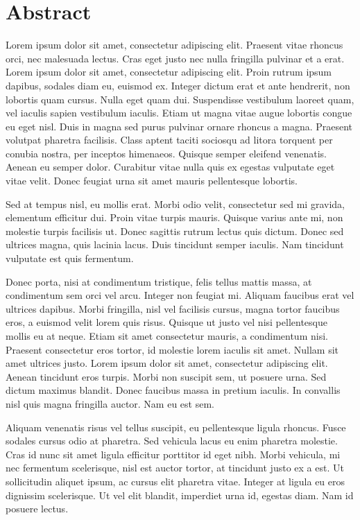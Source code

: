 \chapter*{Abstract}

Lorem ipsum dolor sit amet, consectetur adipiscing elit. Praesent vitae rhoncus orci, nec malesuada lectus. Cras eget justo nec nulla fringilla pulvinar et a erat. Lorem ipsum dolor sit amet, consectetur adipiscing elit. Proin rutrum ipsum dapibus, sodales diam eu, euismod ex. Integer dictum erat et ante hendrerit, non lobortis quam cursus. Nulla eget quam dui. Suspendisse vestibulum laoreet quam, vel iaculis sapien vestibulum iaculis. Etiam ut magna vitae augue lobortis congue eu eget nisl. Duis in magna sed purus pulvinar ornare rhoncus a magna. Praesent volutpat pharetra facilisis. Class aptent taciti sociosqu ad litora torquent per conubia nostra, per inceptos himenaeos. Quisque semper eleifend venenatis. Aenean eu semper dolor. Curabitur vitae nulla quis ex egestas vulputate eget vitae velit. Donec feugiat urna sit amet mauris pellentesque lobortis.

Sed at tempus nisl, eu mollis erat. Morbi odio velit, consectetur sed mi gravida, elementum efficitur dui. Proin vitae turpis mauris. Quisque varius ante mi, non molestie turpis facilisis ut. Donec sagittis rutrum lectus quis dictum. Donec sed ultrices magna, quis lacinia lacus. Duis tincidunt semper iaculis. Nam tincidunt vulputate est quis fermentum.

Donec porta, nisi at condimentum tristique, felis tellus mattis massa, at condimentum sem orci vel arcu. Integer non feugiat mi. Aliquam faucibus erat vel ultrices dapibus. Morbi fringilla, nisl vel facilisis cursus, magna tortor faucibus eros, a euismod velit lorem quis risus. Quisque ut justo vel nisi pellentesque mollis eu at neque. Etiam sit amet consectetur mauris, a condimentum nisi. Praesent consectetur eros tortor, id molestie lorem iaculis sit amet. Nullam sit amet ultrices justo. Lorem ipsum dolor sit amet, consectetur adipiscing elit. Aenean tincidunt eros turpis. Morbi non suscipit sem, ut posuere urna. Sed dictum maximus blandit. Donec faucibus massa in pretium iaculis. In convallis nisl quis magna fringilla auctor. Nam eu est sem.

Aliquam venenatis risus vel tellus suscipit, eu pellentesque ligula rhoncus. Fusce sodales cursus odio at pharetra. Sed vehicula lacus eu enim pharetra molestie. Cras id nunc sit amet ligula efficitur porttitor id eget nibh. Morbi vehicula, mi nec fermentum scelerisque, nisl est auctor tortor, at tincidunt justo ex a est. Ut sollicitudin aliquet ipsum, ac cursus elit pharetra vitae. Integer at ligula eu eros dignissim scelerisque. Ut vel elit blandit, imperdiet urna id, egestas diam. Nam id posuere lectus.


